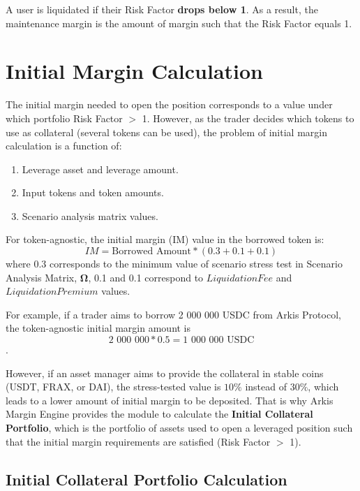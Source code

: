 \documentclass[conference]{IEEEtran}
\begin{document}
A user is liquidated if their Risk Factor \textbf{drops below 1}. As a result, the maintenance margin is the amount of margin such that the Risk Factor equals 1.

 \section{Initial Margin Calculation}
 
The initial margin needed to open the position corresponds to a value under which portfolio Risk Factor $>$ 1. However, as the trader decides which tokens to use as collateral (several tokens can be used), the problem of initial margin calculation is a function of: 
\begin{enumerate}
	\item Leverage asset and leverage amount. 
	\item Input tokens and token amounts. 
	\item Scenario analysis matrix values. 
\end{enumerate} 

For token-agnostic, the initial margin (IM) value in the borrowed token is: $$IM = \text{Borrowed Amount} *(0.3+0.1+0.1)$$ where 0.3 corresponds to the minimum value of scenario stress test in Scenario Analysis Matrix, $\boldsymbol{\Omega}$, 0.1 and 0.1 correspond to $Liquidation Fee$  and $Liquidation Premium$ values.

For example, if a trader aims to borrow 2 000 000 USDC from Arkis Protocol, the token-agnostic initial margin amount is $$\text{2 000 000} * 0.5 = \text{1 000 000 USDC}$$.

However, if an asset manager aims to provide the collateral in stable coins (USDT, FRAX, or DAI), the stress-tested value is $10\%$ instead of $30\%$, which leads to a lower amount of initial margin to be deposited. That is why Arkis Margin Engine provides the module to calculate the \textbf{Initial Collateral Portfolio}, which is the portfolio of assets used to open a leveraged position such that the initial margin requirements are satisfied (Risk Factor $>$ 1).

\subsection{Initial Collateral Portfolio Calculation}
\end{document}
